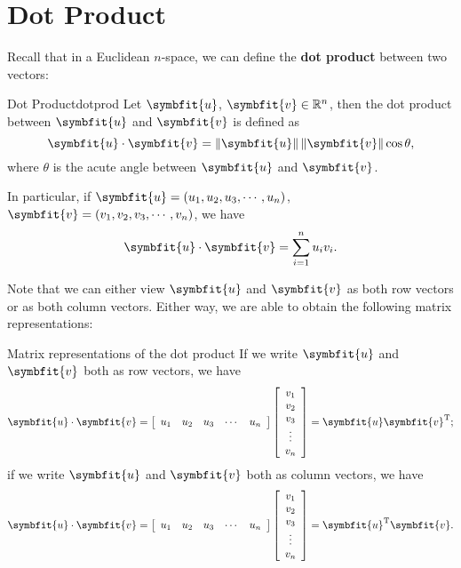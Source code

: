 \documentclass[math]{amznotes}
\theoremstyle{remark}
\begin{document}
\section{Dot Product}
Recall that in a Euclidean $n$-space, we can define the {\color{red} \textbf{dot product}} between two vectors:
\begin{dfnbox}{Dot Product}{dotprod}
    Let $\symbfit{u}$, $\symbfit{v} \in \R^n$, then the dot product between $\symbfit{u}$ and $\symbfit{v}$ is defined as
    \begin{equation*}
        \symbfit{u} \cdot \symbfit{v} = \left\lVert \symbfit{u} \right\rVert \left\lVert \symbfit{v} \right\rVert \cos{\theta},
    \end{equation*}
    where $\theta$ is the acute angle between $\symbfit{u}$ and $\symbfit{v}$.

    In particular, if $\symbfit{u} = \left(u_1, u_2, u_3, \cdots, u_n\right)$, $\symbfit{v} = \left(v_1, v_2, v_3, \cdots, v_n\right)$, we have
    \begin{equation*}
        \symbfit{u} \cdot \symbfit{v} = \sum_{i = 1}^{n}u_i v_i.
    \end{equation*}
\end{dfnbox}
Note that we can either view $\symbfit{u}$ and $\symbfit{v}$ as both row vectors or as both column vectors. Either way, we are able to obtain the following matrix representations:
\begin{genbox}{Matrix representations of the dot product}
    If we write $\symbfit{u}$ and $\symbfit{v}$ both as row vectors, we have
    \begin{equation*}
        \symbfit{u} \cdot \symbfit{v} = \left[\begin{array}{ccccc}
                u_1 & u_2 & u_3 & \cdots & u_n
            \end{array}\right] \left[\begin{array}{c}
                v_1    \\
                v_2    \\
                v_3    \\
                \vdots \\
                v_n
            \end{array}\right] = \symbfit{u}\symbfit{v}^{\mathrm{T}};
    \end{equation*}
    if we write $\symbfit{u}$ and $\symbfit{v}$ both as column vectors, we have
    \begin{equation*}
        \symbfit{u} \cdot \symbfit{v} = \left[\begin{array}{ccccc}
                u_1 & u_2 & u_3 & \cdots & u_n
            \end{array}\right] \left[\begin{array}{c}
                v_1    \\
                v_2    \\
                v_3    \\
                \vdots \\
                v_n
            \end{array}\right] = \symbfit{u}^{\mathrm{T}}\symbfit{v}.
    \end{equation*}
\end{genbox}
\end{document}
